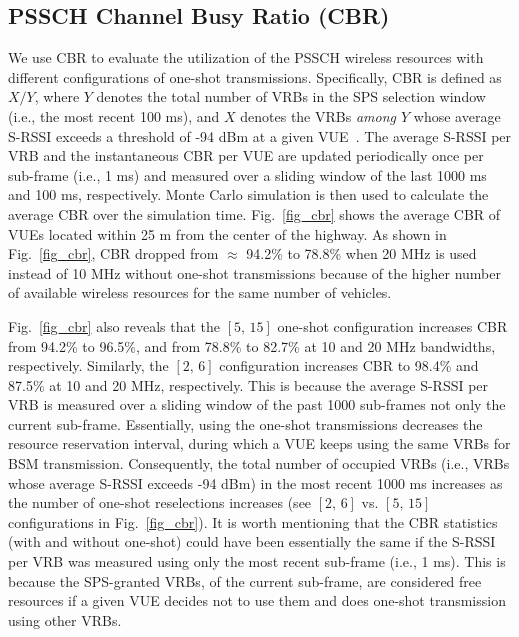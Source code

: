 \documentclass[conference]{IEEEtran}
\begin{document}
\subsection{PSSCH Channel Busy Ratio (CBR)}\label{sec_sub_cbr}
We use CBR to evaluate the utilization of the  PSSCH wireless resources with different configurations of one-shot transmissions. Specifically, CBR is defined as $X/Y$, where $Y$ denotes the total number of VRBs in the SPS selection window (i.e., the most recent 100 ms), and $X$ denotes the VRBs \textit{among $Y$} whose average S-RSSI exceeds a threshold of -94 dBm at a given VUE~\cite{3gpp36321}. The average S-RSSI per VRB and the instantaneous CBR per VUE are updated periodically once per sub-frame (i.e., 1 ms) and measured over a sliding window of the last 1000 ms and 100 ms, respectively. Monte Carlo simulation is then used to calculate the average CBR over the simulation time. Fig.~\ref{fig_cbr} shows the average CBR of VUEs located within 25 m from the center of the highway. As shown in Fig.~\ref{fig_cbr}, CBR dropped from $\approx$ 94.2\% to 78.8\% when 20 MHz is used instead of 10 MHz without one-shot transmissions because of the higher number of available wireless resources for the same number of vehicles.  %

Fig.~\ref{fig_cbr} also reveals that the $[5,\,15]$ one-shot configuration increases CBR from 94.2\% to 96.5\%, and from 78.8\% to 82.7\% at 10 and 20 MHz bandwidths, respectively. Similarly, the $[2,\,6]$ configuration increases CBR to 98.4\% and 87.5\% at 10 and 20 MHz, respectively. This is because the average S-RSSI per VRB is measured over a sliding window of the past 1000 sub-frames not only the current sub-frame. Essentially, using the one-shot transmissions decreases the resource reservation interval, during which a VUE keeps using the same VRBs for BSM transmission. Consequently, the total number of occupied VRBs (i.e., VRBs whose average S-RSSI exceeds -94 dBm) in the most recent 1000 ms increases as the number of one-shot reselections increases (see $[2,\,6]$ vs. $[5,\,15]$ configurations in Fig.~\ref{fig_cbr}). It is worth mentioning that the CBR statistics (with and without one-shot) could have been essentially the same if the S-RSSI per VRB was measured using only the most recent sub-frame (i.e., 1 ms). This is because the SPS-granted VRBs, of the current sub-frame, are considered free resources if a given VUE decides not to use them and does one-shot transmission using other VRBs.   
\end{document}
